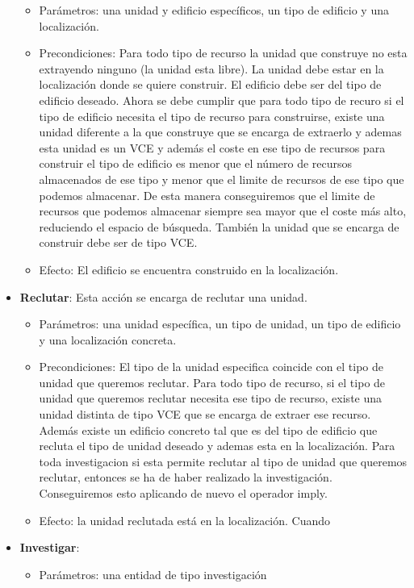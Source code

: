 \begin{itemize}
\begin{itemize}
         \item Parámetros: una unidad y edificio específicos, un tipo de edificio y una localización.
         \item Precondiciones: Para todo tipo de recurso la unidad que construye no esta extrayendo ninguno (la unidad esta libre). La unidad debe estar en la localización donde se quiere construir. El edificio debe ser del tipo de edificio deseado. Ahora se debe cumplir que para todo tipo de recuro si el tipo de edificio necesita el tipo de recurso para construirse, existe una unidad diferente a la que construye que se encarga de extraerlo y ademas esta unidad es un VCE y además el coste en ese tipo de recursos para construir el tipo de edificio es menor que el número de recursos almacenados de ese tipo y menor que el limite de recursos de ese tipo que podemos almacenar. De esta manera conseguiremos que el limite de recursos que podemos almacenar siempre sea mayor que el coste más alto, reduciendo el espacio de búsqueda. También la unidad que se encarga de construir debe ser de tipo VCE.
         \item Efecto: El edificio se encuentra construido en la localización.
      \end{itemize}
   \item \textbf{Reclutar}: Esta acción se encarga de reclutar una unidad.
      \begin{itemize}
         \item Parámetros: una unidad específica, un tipo de unidad, un tipo de edificio y una localización concreta.
         \item Precondiciones: El tipo de la unidad especifica coincide con el tipo de unidad que queremos reclutar. Para todo tipo de recurso, si el tipo de unidad que queremos reclutar necesita ese tipo de recurso, existe una unidad distinta de tipo VCE que se encarga de extraer ese recurso. Además existe un edificio concreto tal que es del tipo de edificio que recluta el tipo de unidad deseado y ademas esta en la localización. Para toda investigacion si esta permite reclutar al tipo de unidad que queremos reclutar, entonces se ha de haber realizado la investigación. Conseguiremos esto aplicando de nuevo el operador imply.
         \item Efecto: la unidad reclutada está en la localización. Cuando
      \end{itemize}
   \item \textbf{Investigar}:
      \begin{itemize}
         \item Parámetros: una entidad de tipo investigación

\end{itemize}
\end{itemize}

